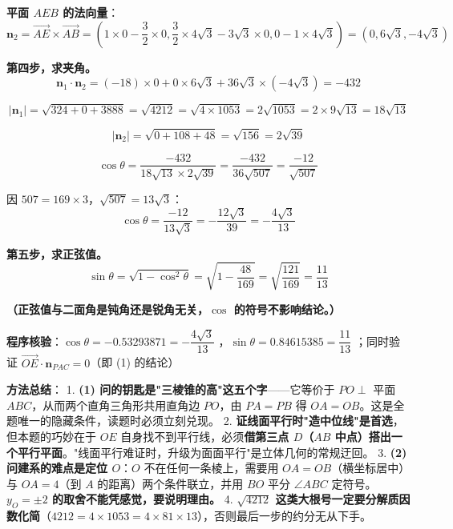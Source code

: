 \textbf{平面 $AEB$ 的法向量}：
\[\boldsymbol n_2=\overrightarrow{AE}\times\overrightarrow{AB}=\left(1\times0-\frac32\times0,\frac32\times4\sqrt3-3\sqrt3\times0,0-1\times4\sqrt3\right)=\left(0,6\sqrt3,-4\sqrt3\right)\]

\textbf{第四步，求夹角。}
\[\boldsymbol n_1\cdot\boldsymbol n_2=(-18)\times0+0\times6\sqrt3+36\sqrt3\times\left(-4\sqrt3\right)=-432\]

\[\left|\boldsymbol n_1\right|=\sqrt{324+0+3888}=\sqrt{4212}=\sqrt{4\times1053}=2\sqrt{1053}=2\times9\sqrt{13}=18\sqrt{13}\]

\[\left|\boldsymbol n_2\right|=\sqrt{0+108+48}=\sqrt{156}=2\sqrt{39}\]

\[\cos\theta=\frac{-432}{18\sqrt{13}\times2\sqrt{39}}=\frac{-432}{36\sqrt{507}}=\frac{-12}{\sqrt{507}}\]

因 $507=169\times3$，$\sqrt{507}=13\sqrt3$：
\[\cos\theta=\frac{-12}{13\sqrt3}=-\frac{12\sqrt3}{39}=-\frac{4\sqrt3}{13}\]

\textbf{第五步，求正弦值。}
\[\sin\theta=\sqrt{1-\cos^{2}\theta}=\sqrt{1-\frac{48}{169}}=\sqrt{\frac{121}{169}}=\frac{11}{13}\]

\textbf{（正弦值与二面角是钝角还是锐角无关，$\cos$ 的符号不影响结论。）}

\textbf{程序核验}：$\cos\theta=-0.53293871=-\dfrac{4\sqrt3}{13}$ ，$\sin\theta=0.84615385=\dfrac{11}{13}$ ；同时验证 $\overrightarrow{OE}\cdot\boldsymbol n_{PAC}=0$（即 (1) 的结论）


\begin{gktip}
\textbf{方法总结}：
1. \textbf{(1) 问的钥匙是"三棱锥的高"这五个字}——它等价于 $PO\perp$ 平面 $ABC$，从而两个直角三角形共用直角边 $PO$，由 $PA=PB$ 得 $OA=OB$。这是全题唯一的隐藏条件，读题时必须立刻兑现。
2. \textbf{证线面平行时"造中位线"是首选}，但本题的巧妙在于 $OE$ 自身找不到平行线，必须\textbf{借第三点 $D$（$AB$ 中点）搭出一个平行平面}。"线面平行难证时，升级为面面平行"是立体几何的常规迂回。
3. \textbf{(2) 问建系的难点是定位 $O$}：$O$ 不在任何一条棱上，需要用 $OA=OB$（横坐标居中）与 $OA=4$（到 $A$ 的距离）两个条件联立，并用 $BO$ 平分 $\angle ABC$ 定符号。\textbf{$y_O=\pm2$ 的取舍不能凭感觉，要说明理由。}
4. \textbf{$\sqrt{4212}$ 这类大根号一定要分解质因数化简}（$4212=4\times1053=4\times81\times13$），否则最后一步的约分无从下手。
\end{gktip}

\par\medskip

